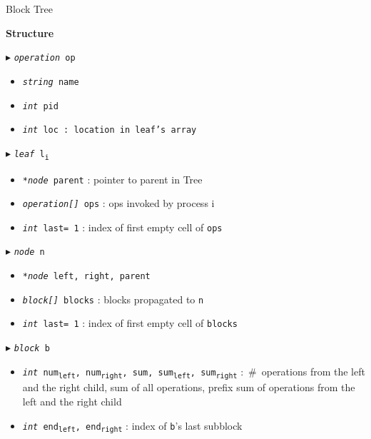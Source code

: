 \documentclass[10pt]{article}
\theoremstyle{definition}
\begin{document}
\begin{algorithm}
\caption{Block Tree \label{alg2}}
\begin{algorithmic}[1]
\begin{multicols}{2}

\Statex \textbf{Structure}

\Statex $\blacktriangleright$ \texttt{\textsl{operation} op}
\begin{itemize}
\item \texttt{\textsl{string} name}
\item \texttt{\textsl{int} pid}
\item \texttt{\textsl{int} loc \textsf{: location in leaf's array}}
\end{itemize}


\Statex $\blacktriangleright$ \texttt{\textsl{leaf} l\textsubscript{i}}
\begin{itemize}
\item \texttt{\textsl{*node} parent} \textsf{: pointer to parent in Tree}
\item \texttt{\textsl{operation[]} ops} \textsf{: ops invoked by process i}
\item \texttt{\textsl{int} last= 1} \textsf{: index of first empty cell of \texttt{ops}}
\end{itemize}


\Statex $\blacktriangleright$ \texttt{\textsl{node} n}
\begin{itemize}
\item \texttt{\textsl{*node} left, right, parent}
\item \texttt{\textsl{block[]} blocks} \textsf{: blocks propagated to \texttt{n}}
\item \texttt{\textsl{int} last= 1} \textsf{: index of first empty cell of \texttt{blocks}}
\end{itemize}



\Statex $\blacktriangleright$ \texttt{\textsl{block} b}
\begin{itemize}
  \item \texttt{\textsl{int} num\textsubscript{left}, num\textsubscript{right}, sum, sum\textsubscript{left}, sum\textsubscript{right}} \textsf{:~\#~operations from the left and the right child, sum of all operations, prefix sum of operations from the left and the right child}
  \item \texttt{\textsl{int} end\textsubscript{left}, end\textsubscript{right}} \textsf{: index of \texttt{b}'s last subblock}
\end{itemize}



\end{multicols}
\end{algorithmic}
\end{algorithm}
\end{document}
